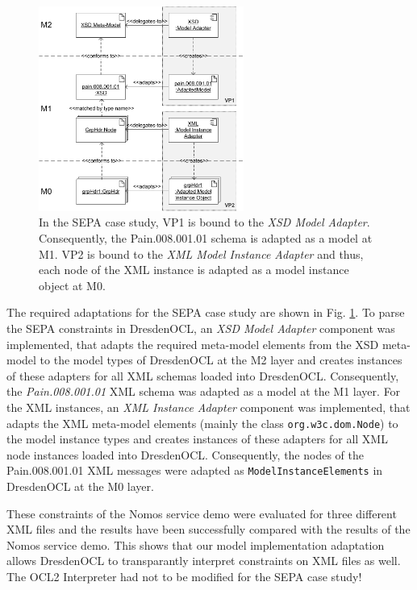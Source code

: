 \begin{figure}[!t]
	\centering
		\includegraphics[width=0.60\textwidth]{figures/casestudy02.pdf}
	\caption{In the SEPA case study, VP1 is bound to the \textit{XSD Model Adapter}. 
	  Consequently, the Pain.008.001.01 schema is adapted as a model at M1.
	  VP2 is bound to the \textit{XML Model Instance Adapter} and thus, each node of the XML
	  instance is adapted as a model instance object at M0.}
	\label{fig:casestudy02}
\end{figure}

The required adaptations for the SEPA case study are shown in Fig. \ref{fig:casestudy02}.
To parse the SEPA constraints
in DresdenOCL, an \textit{XSD Model Adapter} component was implemented, that 
adapts the required meta-model elements from the XSD meta-model to the model 
types of DresdenOCL at the M2 layer and creates instances of these adapters for all XML schemas 
loaded into DresdenOCL. 
Consequently, the \textit{Pain.008.001.01} XML schema was adapted as a model at the M1 layer.
 For the XML instances, an \textit{XML Instance Adapter} component was implemented,
that adapts the XML meta-model elements (mainly the class \texttt{org.w3c.dom.Node})
to the model instance types and creates instances of these adapters for all XML node instances
loaded into DresdenOCL. Consequently, the nodes of the Pain.008.001.01 XML messages
were adapted as \texttt{ModelInstanceElements} in DresdenOCL at the M0 layer.

These constraints of the Nomos service demo were evaluated for three different XML files 
and the results have been successfully compared with the results of the Nomos service demo.
This shows that our model implementation adaptation allows DresdenOCL to transparantly interpret
constraints on XML files as well. The OCL2 Interpreter had not to be modified for the SEPA case study!


